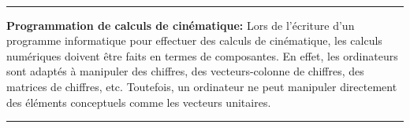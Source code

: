 \\ \noindent
\rule{\linewidth}{0.3mm}
\textbf{Programmation de calculs de cinématique:} Lors de l'écriture d'un programme informatique pour effectuer des calculs de cinématique, les calculs numériques doivent être faits en termes de composantes. En effet, les ordinateurs sont adaptés à manipuler des chiffres, des vecteurs-colonne de chiffres, des matrices de chiffres, etc. Toutefois, un ordinateur ne peut manipuler directement des éléments conceptuels comme les vecteurs unitaires.
\\
\rule{\linewidth}{0.3mm}



